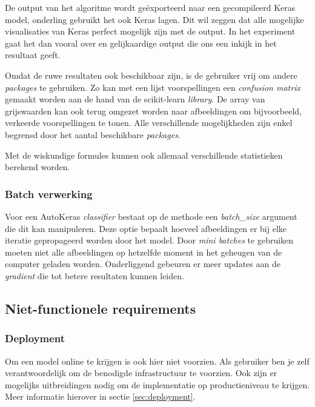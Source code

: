De output van het algoritme wordt geëxporteerd naar een gecompileerd Keras model, onderling gebruikt het ook Keras lagen. Dit wil zeggen dat alle mogelijke visualisaties van Keras perfect mogelijk zijn met de output. In het experiment gaat het dan vooral over  en gelijkaardige output die ons een inkijk in het resultaat geeft.

Omdat de ruwe resultaten ook beschikbaar zijn, is de gebruiker vrij om andere \textit{packages} te gebruiken. Zo kan met een lijst voorspellingen een \textit{confusion matrix} gemaakt worden aan de hand van de scikit-learn \textit{library}. De array van grijswaarden kan ook terug omgezet worden naar afbeeldingen om bijvoorbeeld, verkeerde voorspellingen te tonen. Alle verschillende mogelijkheden zijn enkel begrensd door het aantal beschikbare \textit{packages}.

Met de wiskundige formules kunnen ook allemaal verschillende statistieken berekend worden.

\subsubsection{Batch verwerking}
\label{sucsubsec:autokeras-fr-batch}

Voor een AutoKeras \textit{classifier} bestaat op de  methode een \textit{batch\_size} argument die dit kan manipuleren. Deze optie bepaalt hoeveel afbeeldingen er bij elke iteratie gepropageerd worden door het model. Door \textit{mini batches} te gebruiken moeten niet alle afbeeldingen op hetzelfde moment in het geheugen van de computer geladen worden. Onderliggend gebeuren er meer updates aan de \textit{gradient} die tot betere resultaten kunnen leiden.

\subsection{Niet-functionele requirements}
\label{subsec:autokeras-nfr} 

\subsubsection{Deployment}
\label{sucsubsec:autokeras-nfr-deployment}

Om een model online te krijgen is ook hier niet voorzien. Als gebruiker ben je zelf verantwoordelijk om de benodigde infrastructuur te voorzien. Ook zijn er mogelijks uitbreidingen nodig om de implementatie op productieniveau te krijgen. Meer informatie hierover in sectie \ref{sec:deployment}.

